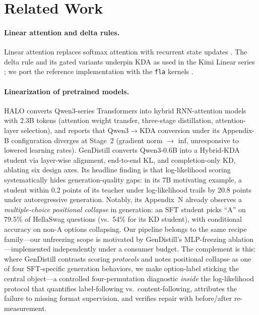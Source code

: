 \documentclass[11pt]{article}
\begin{document}
\section{Related Work}

\paragraph{Linear attention and delta rules.}
Linear attention replaces softmax attention with recurrent state updates
\citep{katharopoulos2020transformers}. The delta rule and its gated
variants \citep{yang2024gated} underpin KDA as used in the Kimi Linear
series \citep{kimilinear}; we port the reference implementation with the
\texttt{fla} kernels \citep{fla}.

\paragraph{Linearization of pretrained models.}
HALO \citep{chen2026halo} converts Qwen3-series Transformers into hybrid
RNN-attention models with 2.3B tokens (attention weight transfer,
three-stage distillation, attention-layer selection), and reports that
Qwen3$\to$KDA conversion under its Appendix-B configuration diverges at
Stage~2 (gradient norm $\to$ inf, unresponsive to lowered learning
rates). GenDistill \citep{kostelec2026gendistill} converts Qwen3-0.6B
into a Hybrid-KDA student via layer-wise alignment, end-to-end KL, and
completion-only KD, ablating six design axes. Its headline finding is
that log-likelihood scoring systematically hides generation-quality
gaps: in its 7B motivating example, a student within 0.2 points of its
teacher under log-likelihood trails by 20.8 points under autoregressive
generation. Notably, its Appendix~N already observes a
\emph{multiple-choice positional collapse} in generation: an SFT
student picks ``A'' on 79.5\% of HellaSwag questions (vs.\ 54\% for its
KD student), with conditional accuracy on non-A options collapsing.
Our pipeline belongs to the same recipe family---our unfreezing scope
is motivated by GenDistill's MLP-freezing ablation---implemented
independently under a consumer budget. The complement is this: where
GenDistill contrasts scoring \emph{protocols} and notes positional
collapse as one of four SFT-specific generation behaviors, we make
option-label sticking the central object---a controlled four-permutation
diagnostic \emph{inside} the log-likelihood protocol that quantifies
label-following vs.\ content-following, attributes the failure to
missing format supervision, and verifies repair with before/after
re-measurement.
\end{document}
